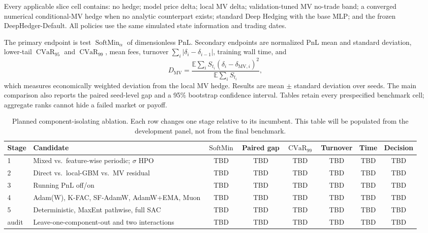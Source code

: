 \documentclass[sigconf,balance=false]{acmart}
\newcommand{\methodname}{DeepHedger-Default}
\newcommand{\softmin}{\operatorname{SoftMin}}
\newcommand{\cvar}{\operatorname{CVaR}}
\begin{document}
Every applicable slice cell contains: no hedge; model price delta; local MV delta;
validation-tuned MV no-trade band; a converged numerical conditional-MV hedge
when no analytic counterpart exists; standard Deep Hedging with the base MLP;
and the frozen \methodname.  All policies use the same simulated state
information and trading dates.

The primary endpoint is test $\softmin_\alpha$ of dimensionless PnL.
Secondary endpoints are normalized PnL mean
and standard deviation, lower-tail $\cvar_{95}$ and $\cvar_{99}$, mean fees,
turnover $\sum_i|\delta_i-\delta_{i-1}|$, training wall time, and
\begin{equation}
 D_{\mathrm{MV}} =
 \frac{\mathbb{E}\sum_i S_{t_i}
       (\delta_i-\delta_{\mathrm{MV},i})^2}
      {\mathbb{E}\sum_i S_{t_i}},
\end{equation}
which measures economically weighted deviation from the local MV hedge.
Results are mean $\pm$ standard deviation over seeds.  The main comparison also
reports the paired seed-level gap and a 95\% bootstrap confidence interval.
Tables retain every prespecified benchmark cell; aggregate ranks cannot hide a
failed market or payoff.

\begin{table}[t]
  \caption{Planned component-isolating ablation.  Each row changes one stage
  relative to its incumbent.  This table will be populated from the
  development panel, not from the final benchmark.}
  \label{tab:ablation}
  \small
  \begin{tabular}{@{}llcccccc@{}}
    \toprule
    Stage & Candidate & $\softmin$ & Paired gap & $\cvar_{99}$ & Turnover &
    Time & Decision \\
    \midrule
    1 & Mixed vs.\ feature-wise periodic; $\sigma$ HPO
      & TBD & TBD & TBD & TBD & TBD & TBD \\
    2 & Direct vs.\ local-GBM vs.\ MV residual
      & TBD & TBD & TBD & TBD & TBD & TBD \\
    3 & Running PnL off/on
      & TBD & TBD & TBD & TBD & TBD & TBD \\
    4 & Adam(W), K-FAC, SF-AdamW, AdamW+EMA, Muon
      & TBD & TBD & TBD & TBD & TBD & TBD \\
    5 & Deterministic, MaxEnt pathwise, full SAC
      & TBD & TBD & TBD & TBD & TBD & TBD \\
    audit & Leave-one-component-out and two interactions
      & TBD & TBD & TBD & TBD & TBD & TBD \\
    \bottomrule
  \end{tabular}
\end{table}
\end{document}
